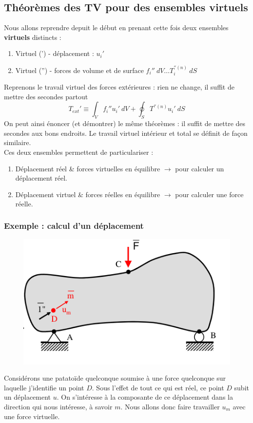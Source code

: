 	\subsection{Théorèmes des TV pour des ensembles virtuels}
	Nous allons reprendre depuit le début en prenant cette fois deux 
	ensembles \textbf{virtuels} distincts :
	\begin{enumerate}
	\item Virtuel (') - déplacement : $u_i'$
	\item Virtuel ('') - forces de volume et de surface $f_i''\ dV\dots 
	T_i^{''(n)}\ dS$
	\end{enumerate}
	Reprenons le travail virtuel des forces extérieures : rien ne change, 
	il suffit de mettre des secondes partout
	\begin{equation}
	T_{ext}' \equiv \int_V f_i''u_i'\ dV + \oint_S T^{''(n)}u_i'\ dS
	\end{equation}
	On peut ainsi énoncer (et démontrer) le même théorèmes : il suffit 
	de mettre des secondes aux bons endroits. Le travail virtuel 
	intérieur et total se définit de façon similaire.\\
	
	Ces deux ensembles permettent de particulariser :
	\begin{enumerate}
	\item Déplacement réel \& forces virtuelles en équilibre $\rightarrow$ 
	pour calculer un déplacement réel.
	\item Déplacement virtuel \& forces réelles en équilibre $\rightarrow$ 
	pour calculer une force réelle.	
	\end{enumerate}
	
		\newpage
		\subsubsection{Exemple : calcul d'un déplacement}
		\begin{figure}
		\vspace{-5mm}
		\includegraphics[scale=0.4]{ch9/image2.png}
		\end{figure}	
		Considérons une patatoïde quelconque soumise à une force 
		quelconque sur laquelle j'identifie un point $D$. Sous l'effet de 
		tout ce qui est réel, ce point $D$ subit un déplacement $u$. On 
		s'intéresse à la composante de ce déplacement dans la direction 
		qui nous intéresse, à savoir $m$. Nous allons donc faire travailler 
		$u_m$ avec une force virtuelle.\\
		
